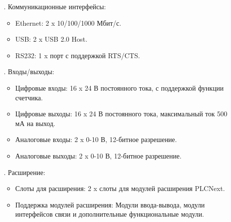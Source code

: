 {\begin{itemize}[leftmargin=2.15cm, labelwidth=0.65cm, labelsep=0.0cm]
\begin{itemize}[leftmargin=1.15cm, labelwidth=0.65cm, labelsep=0.0cm]
			\item Встроенная память: 1 ГБ RAM, 4 ГБ eMMC.
			
		\end{itemize}
		
		\addtocounter{itemcntr}{1}
		
		\item[\theitemcntr. ] Коммуникационные интерфейсы:
		
		\begin{itemize}[leftmargin=1.15cm, labelwidth=0.65cm, labelsep=0.0cm] 
			
			\item Ethernet: 2 x 10/100/1000 Мбит/с.
			
			\item USB: 2 x USB 2.0 Host.
			
			\item RS232: 1 x порт с поддержкой RTS/CTS.
			
		\end{itemize}
		
		\addtocounter{itemcntr}{1}
		
		\item[\theitemcntr. ] Входы/выходы:
		
			\begin{itemize}[leftmargin=1.15cm, labelwidth=0.65cm, labelsep=0.0cm] 
			
			\item	Цифровые входы: 16 x 24 В постоянного тока, с поддержкой функции счетчика.
			\item	Цифровые выходы: 16 x 24 В постоянного тока, максимальный ток 500 мА на выход.
			\item	Аналоговые входы: 2 x 0-10 В, 12-битное разрешение.
			\item	Аналоговые выходы: 2 x 0-10 В, 12-битное разрешение.
			
		\end{itemize}
		
		\addtocounter{itemcntr}{1}
		
		\item[\theitemcntr. ] Расширение:
		
		\begin{itemize}[leftmargin=1.15cm, labelwidth=0.65cm, labelsep=0.0cm] 
				
				\item	Слоты для расширения: 2 x слоты для модулей расширения PLCNext.
				
				\item	Поддержка модулей расширения: Модули ввода-вывода, модули интерфейсов связи и дополнительные функциональные модули.
			

\end{itemize}
\end{itemize}}
